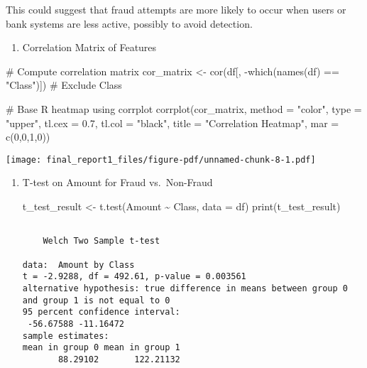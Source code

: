 \documentclass[
  11pt,
  letterpaper,
  DIV=11,
  numbers=noendperiod]{scrartcl}
\newenvironment{Shaded}{}{}
\newcommand{\AttributeTok}[1]{\textcolor[rgb]{0.84,0.23,0.29}{#1}}
\newcommand{\CommentTok}[1]{\textcolor[rgb]{0.42,0.45,0.49}{#1}}
\newcommand{\DecValTok}[1]{\textcolor[rgb]{0.00,0.36,0.77}{#1}}
\newcommand{\FloatTok}[1]{\textcolor[rgb]{0.00,0.36,0.77}{#1}}
\newcommand{\FunctionTok}[1]{\textcolor[rgb]{0.44,0.26,0.76}{#1}}
\newcommand{\NormalTok}[1]{\textcolor[rgb]{0.14,0.16,0.18}{#1}}
\newcommand{\OtherTok}[1]{\textcolor[rgb]{0.44,0.26,0.76}{#1}}
\newcommand{\SpecialCharTok}[1]{\textcolor[rgb]{0.00,0.36,0.77}{#1}}
\newcommand{\StringTok}[1]{\textcolor[rgb]{0.01,0.18,0.38}{#1}}
\providecommand{\tightlist}{%
  \setlength{\itemsep}{0pt}\setlength{\parskip}{0pt}}\usepackage{longtable,booktabs,array}
\begin{document}
This could suggest that fraud attempts are more likely to occur when
users or bank systems are less active, possibly to avoid detection.

\begin{enumerate}
\def\labelenumi{\arabic{enumi}.}
\setcounter{enumi}{3}
\tightlist
\item
  Correlation Matrix of Features
\end{enumerate}

\begin{Shaded}
\begin{Highlighting}[]
\CommentTok{\# Compute correlation matrix}
\NormalTok{cor\_matrix }\OtherTok{\textless{}{-}} \FunctionTok{cor}\NormalTok{(df[, }\SpecialCharTok{{-}}\FunctionTok{which}\NormalTok{(}\FunctionTok{names}\NormalTok{(df) }\SpecialCharTok{==} \StringTok{"Class"}\NormalTok{)])  }\CommentTok{\# Exclude \textquotesingle{}Class\textquotesingle{}}

\CommentTok{\# Base R heatmap using corrplot}
\FunctionTok{corrplot}\NormalTok{(cor\_matrix, }\AttributeTok{method =} \StringTok{"color"}\NormalTok{, }\AttributeTok{type =} \StringTok{"upper"}\NormalTok{, }
         \AttributeTok{tl.cex =} \FloatTok{0.7}\NormalTok{, }\AttributeTok{tl.col =} \StringTok{"black"}\NormalTok{, }\AttributeTok{title =} \StringTok{"Correlation Heatmap"}\NormalTok{, }\AttributeTok{mar =} \FunctionTok{c}\NormalTok{(}\DecValTok{0}\NormalTok{,}\DecValTok{0}\NormalTok{,}\DecValTok{1}\NormalTok{,}\DecValTok{0}\NormalTok{))}
\end{Highlighting}
\end{Shaded}

\texttt{[image: final\_report1\_files/figure-pdf/unnamed-chunk-8-1.pdf]}

\begin{enumerate}
\def\labelenumi{\arabic{enumi}.}
\setcounter{enumi}{4}
\item
  T-test on Amount for Fraud vs.~Non-Fraud

\begin{Shaded}
\begin{Highlighting}[]
\NormalTok{t\_test\_result }\OtherTok{\textless{}{-}} \FunctionTok{t.test}\NormalTok{(Amount }\SpecialCharTok{\textasciitilde{}}\NormalTok{ Class, }\AttributeTok{data =}\NormalTok{ df)}
\FunctionTok{print}\NormalTok{(t\_test\_result)}
\end{Highlighting}
\end{Shaded}

\begin{verbatim}

    Welch Two Sample t-test

data:  Amount by Class
t = -2.9288, df = 492.61, p-value = 0.003561
alternative hypothesis: true difference in means between group 0 and group 1 is not equal to 0
95 percent confidence interval:
 -56.67588 -11.16472
sample estimates:
mean in group 0 mean in group 1 
       88.29102       122.21132 
\end{verbatim}
\end{enumerate}
\end{document}
